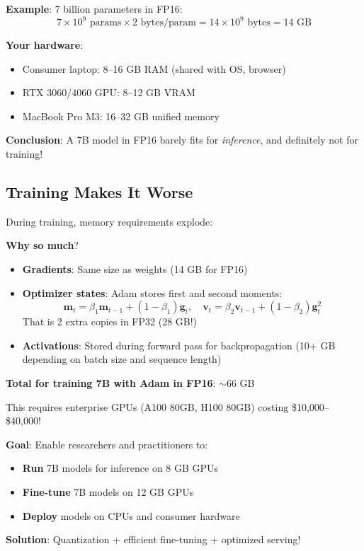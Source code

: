 \documentclass{article}
\begin{document}
\textbf{Example}: 7 billion parameters in FP16:
\[
7 \times 10^9 \text{ params} \times 2 \text{ bytes/param} = 14 \times 10^9 \text{ bytes} = 14 \text{ GB}
\]

\textbf{Your hardware}:
\begin{itemize}
\item Consumer laptop: 8--16 GB RAM (shared with OS, browser)
\item RTX 3060/4060 GPU: 8--12 GB VRAM
\item MacBook Pro M3: 16--32 GB unified memory
\end{itemize}

\textbf{Conclusion}: A 7B model in FP16 barely fits for \textit{inference}, and definitely not for training!

\subsection{Training Makes It Worse}

During training, memory requirements explode:

\begin{center}
\end{center}

\textbf{Why so much}?

\begin{itemize}
\item \textbf{Gradients}: Same size as weights (14 GB for FP16)
\item \textbf{Optimizer states}: Adam stores first and second moments:
\[
\mathbf{m}_t = \beta_1 \mathbf{m}_{t-1} + (1-\beta_1)\mathbf{g}_t, \quad
\mathbf{v}_t = \beta_2 \mathbf{v}_{t-1} + (1-\beta_2)\mathbf{g}_t^2
\]
That is 2 extra copies in FP32 (28 GB!)
\item \textbf{Activations}: Stored during forward pass for backpropagation (10+ GB depending on batch size and sequence length)
\end{itemize}

\textbf{Total for training 7B with Adam in FP16}: $\sim$66 GB

This requires enterprise GPUs (A100 80GB, H100 80GB) costing \$10,000--\$40,000!

\begin{tcolorbox}[colback=red!5!white, colframe=red!50!black, title=The Challenge]
\textbf{Goal}: Enable researchers and practitioners to:
\begin{itemize}
\item \textbf{Run} 7B models for inference on 8 GB GPUs
\item \textbf{Fine-tune} 7B models on 12 GB GPUs
\item \textbf{Deploy} models on CPUs and consumer hardware
\end{itemize}

\textbf{Solution}: Quantization + efficient fine-tuning + optimized serving!
\end{tcolorbox}
\end{document}
